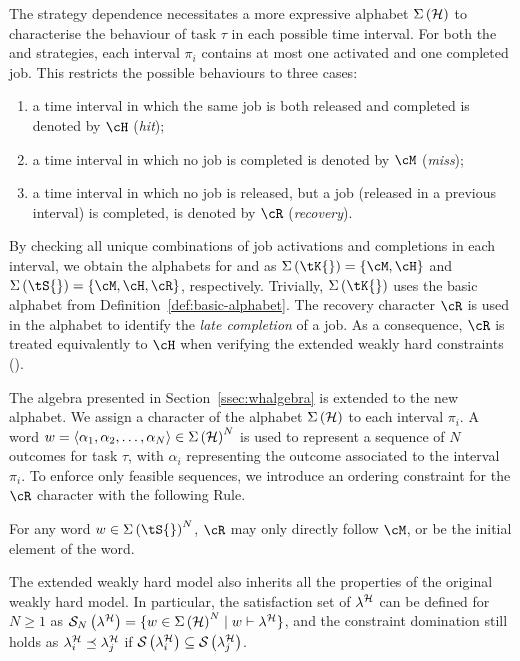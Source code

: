 The strategy dependence necessitates a more expressive alphabet $\Sigma\left( \mathcal{H} \right)$ to characterise the behaviour of task $\tau$ in each possible time interval.
For both the \tK{} and \tS{} strategies, each interval $\pi_i$ contains at most one activated and one completed job.
This restricts the possible behaviours to three cases:
%
\begin{enumerate}[label=(\roman*)]
    \item a time interval in which the same job is both released and completed is denoted by $\cH$ (\emph{hit});
    \item a time interval in which no job is completed is denoted by $\cM$ (\emph{miss});
    \item a time interval in which no job is released, but a job (released in a previous interval) is completed, is denoted by $\cR$ (\emph{recovery}).
\end{enumerate}
%
By checking all unique combinations of job activations and completions in each interval, we obtain the alphabets for \tK{} and \tS{} as $\Sigma\left(\text{\tK{}}\right) = \{ \cM, \cH \}$ and $\Sigma\left(\text{\tS{}}\right) = \{ \cM, \cH, \cR \}$, respectively.
Trivially, $\Sigma\left(\text{\tK{}}\right)$ uses the basic alphabet from Definition~\ref{def:basic-alphabet}.
The recovery character $\cR$ is used in the \tS{} alphabet to identify the \emph{late completion} of a job.
As a consequence, $\cR$ is treated equivalently to $\cH$ when verifying the extended weakly hard constraints (\ewhc{}).

The algebra presented in Section~\ref{ssec:whalgebra} is extended to the new alphabet.
We assign a character of the alphabet $\Sigma\left(\mathcal{H}\right)$ to each interval $\pi_i$.
A word $w = \langle \alpha_1,\alpha_2,\dots,\alpha_N \rangle \in \Sigma\left(\mathcal{H}\right)^N$ is used to represent a sequence of $N$ outcomes for task $\tau$, with $\alpha_i$ representing the outcome associated to the interval $\pi_i$. 
To enforce only feasible sequences, we introduce an ordering constraint for the $\cR$ character with the following Rule.
%
\begin{rule_}%
    \label{rule:R}%
    For any word $w \in \Sigma\left(\text{\tS{}}\right)^N$, $\cR$ may only directly follow $\cM$, or be the initial element of the word.
\end{rule_}

The extended weakly hard model also inherits all the properties of the original weakly hard model.
In particular, the satisfaction set of $\lambda^{\mathcal{H}}$ can be defined for $N\geq 1$ as $\mathcal{S}_{N}\left( \lambda^{\mathcal{H}} \right) = \{ w \in \Sigma\left(\mathcal{H}\right)^N \mid w \vdash \lambda^{\mathcal{H}} \}$, and the constraint domination still holds as $\lambda^{\mathcal{H}}_{i} \preceq \lambda^{\mathcal{H}}_{j}$ if $\mathcal{S}_{}\left( \lambda^{\mathcal{H}}_{i}  \right) \subseteq \mathcal{S}_{}\left( \lambda^{\mathcal{H}}_{j} \right)$.
